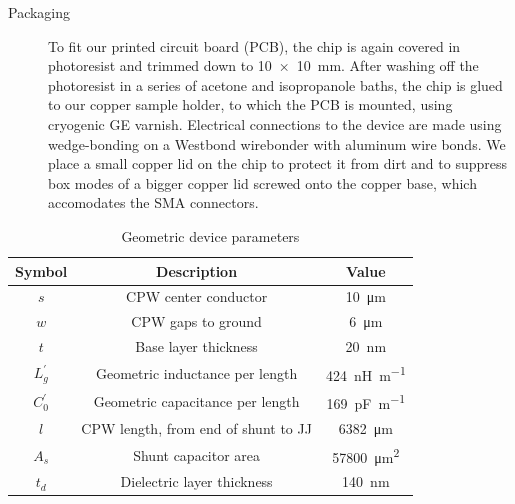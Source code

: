 \begin{description}
	\item[Packaging] To fit our printed circuit board (PCB), the chip is again covered in photoresist and trimmed down to \SI{10x10}{\milli\meter}.
	After washing off the photoresist in a series of acetone and isopropanole baths, the chip is glued to our copper sample holder, to which the PCB is mounted, using cryogenic GE varnish.
	Electrical connections to the device are made using wedge-bonding on a Westbond wirebonder with aluminum wire bonds.
	We place a small copper lid on the chip to protect it from dirt and to suppress box modes of a bigger copper lid screwed onto the copper base, which accomodates the SMA connectors.
\end{description}

\begin{table}
	\centering
	\caption{Geometric device parameters\label{tab:geometry}}
	\begin{tabular}{ccc}
		\hline \hline
		Symbol       & Description                                                                 & Value                            \\
		\hline
		$s$          & CPW center conductor                                                        & \SI{10}{\micro\meter}            \\
		$w$          & CPW gaps to ground                                                          & \SI{6}{\micro\meter}             \\
		$t$          & Base layer thickness                                                        & \SI{20}{\nano\meter}             \\
		$L_g^\prime$ & Geometric inductance per length \cite{simonsCoplanarWaveguideCircuits2001}  & \SI{424}{\nano\henry\per\meter}  \\
		$C_0^\prime$ & Geometric capacitance per length \cite{simonsCoplanarWaveguideCircuits2001} & \SI{169}{\pico\farad\per\meter}  \\
		$l$          & CPW length, from end of shunt to JJ                                         & \SI{6382}{\micro\meter}          \\
		$A_s$        & Shunt capacitor area                                                        & \SI{57800}{\micro\meter\squared} \\
		$t_d$        & Dielectric layer thickness                                                  & \SI{140}{\nano\meter}            \\
		\hline\hline
	\end{tabular}
\end{table}


